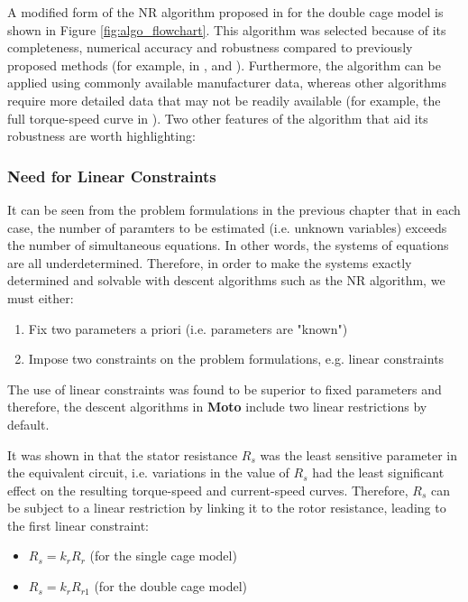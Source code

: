 \documentclass{article}
\begin{document}
A modified form of the NR algorithm proposed in \cite{pedra_2008} for the double cage model is shown in Figure \ref{fig:algo_flowchart}. This algorithm was selected because of its completeness, numerical accuracy and robustness compared to previously proposed methods (for example, in \cite{johnson_1991}, \cite{rogers_1987} and \cite{waters_1983}). Furthermore, the algorithm can be applied using commonly available manufacturer data, whereas other algorithms require more detailed data that may not be readily available (for example, the full torque-speed curve in \cite{lindenmeyer_2001}). Two other features of the algorithm that aid its robustness are worth highlighting:

\subsubsection{Need for Linear Constraints}
\label{sec:linear_constraints}

It can be seen from the problem formulations in the previous chapter that in each case, the number of paramters to be estimated (i.e. unknown variables) exceeds the number of simultaneous equations. In other words, the systems of equations are all underdetermined. Therefore, in order to make the systems exactly determined and solvable with descent algorithms such as the NR algorithm, we must either:

\begin{enumerate}
\item Fix two parameters a priori (i.e. parameters are "known")
\item Impose two constraints on the problem formulations, e.g. linear constraints

\end{enumerate}

The use of linear constraints was found to be superior to fixed parameters and therefore, the descent algorithms in \textbf{Moto} include two linear restrictions by default. 

It was shown in \cite{pedra_2004} that the stator resistance $R_{s}$ was the least sensitive parameter in the equivalent circuit, i.e. variations in the value of $R_{s}$ had the least significant effect on the resulting torque-speed and current-speed curves. Therefore, $R_{s}$ can be subject to a linear restriction by linking it to the rotor resistance, leading to the first linear constraint:

\begin{itemize}
\item $R_{s} = k_{r} R_{r}$ (for the single cage model)
\item $R_{s} = k_{r} R_{r1}$ (for the double cage model)
\end{itemize}
\end{document}
